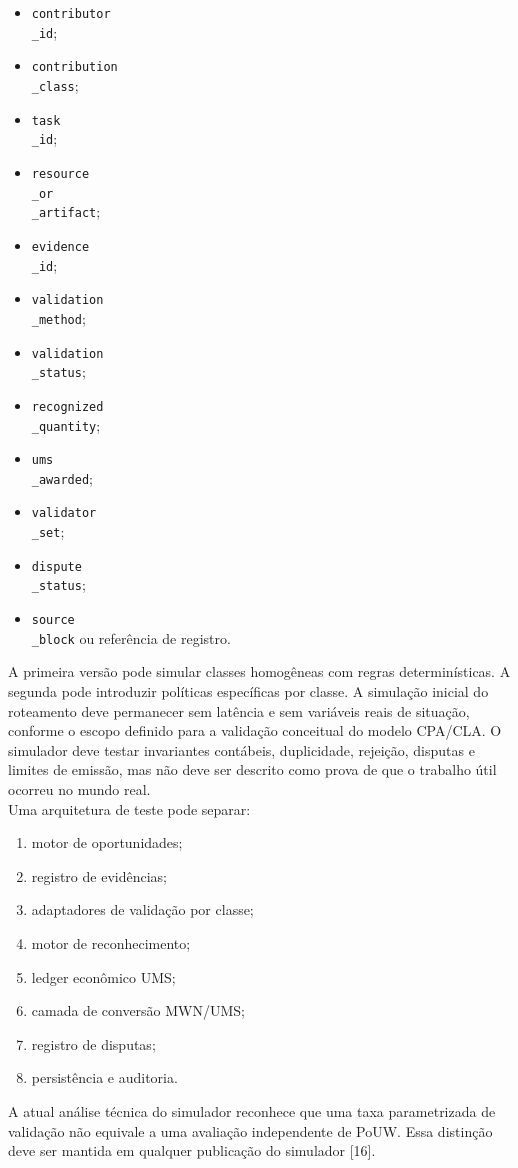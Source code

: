 \documentclass[12pt,a4paper]{article}
\begin{document}
\begin{itemize}
\item \texttt{contributor\\_id};
\item \texttt{contribution\\_class};
\item \texttt{task\\_id};
\item \texttt{resource\\_or\\_artifact};
\item \texttt{evidence\\_id};
\item \texttt{validation\\_method};
\item \texttt{validation\\_status};
\item \texttt{recognized\\_quantity};
\item \texttt{ums\\_awarded};
\item \texttt{validator\\_set};
\item \texttt{dispute\\_status};
\item \texttt{source\\_block} ou referência de registro.

\end{itemize}
A primeira versão pode simular classes homogêneas com regras determinísticas. A segunda pode introduzir políticas específicas por classe. A simulação inicial do roteamento deve permanecer sem latência e sem variáveis reais de situação, conforme o escopo definido para a validação conceitual do modelo CPA/CLA. O simulador deve testar invariantes contábeis, duplicidade, rejeição, disputas e limites de emissão, mas não deve ser descrito como prova de que o trabalho útil ocorreu no mundo real.\\

Uma arquitetura de teste pode separar:\\

\begin{enumerate}
\item motor de oportunidades;
\item registro de evidências;
\item adaptadores de validação por classe;
\item motor de reconhecimento;
\item ledger econômico UMS;
\item camada de conversão MWN/UMS;
\item registro de disputas;
\item persistência e auditoria.

\end{enumerate}
A atual análise técnica do simulador reconhece que uma taxa parametrizada de validação não equivale a uma avaliação independente de PoUW. Essa distinção deve ser mantida em qualquer publicação do simulador [16].\\
\end{document}
